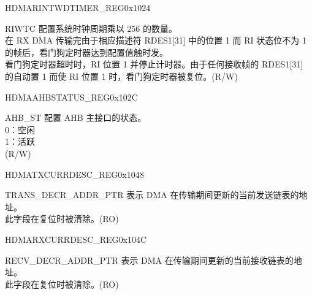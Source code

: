 \begin{register}{H}{DMARINTWDTIMER\_REG}{0x1024}\label{regdesc:DMARINTWDTIMERREG}
%
%
\regnewline%
\begin{regdesc}\begin{reglist}
\item [RIWTC] 配置系统时钟周期乘以 256 的数量。\\
在 RX DMA 传输完由于相应描述符 RDES1[31] 中的位置 1 而 RI 状态位不为 1 的帧后，看门狗定时器达到配置值触时发。\\
看门狗定时器超时时，RI 位置 1 并停止计时器。由于任何接收帧的 RDES1[31] 的自动置 1 而使 RI 位置 1 时，看门狗定时器被复位。(R/W)
\end{reglist}\end{regdesc}
\end{register}

\begin{register}{H}{DMAAHBSTATUS\_REG}{0x102C}\label{regdesc:DMAHBSTATUSREG}
%
%
\regnewline%
\begin{regdesc}\begin{reglist}
\item [AHB\_ST] 配置 AHB 主接口的状态。\\
0：空闲\\
1：活跃\\(R/W)
\end{reglist}\end{regdesc}
\end{register}

\begin{register}{H}{DMATXCURRDESC\_REG}{0x1048}\label{regdesc:DMATXCURRDESCREG}
%
\regnewline%
\begin{regdesc}\begin{reglist}
\item [TRANS\_DECR\_ADDR\_PTR] 表示 DMA 在传输期间更新的当前发送链表的地址。\\
此字段在复位时被清除。(RO)
\end{reglist}\end{regdesc}
\end{register}

\begin{register}{H}{DMARXCURRDESC\_REG}{0x104C}\label{regdesc:DMARXCURRDESCREG}
%
\regnewline%
\begin{regdesc}\begin{reglist}
\item [RECV\_DECR\_ADDR\_PTR] 表示 DMA 在传输期间更新的当前接收链表的地址。\\
此字段在复位时被清除。(RO)
\end{reglist}\end{regdesc}
\end{register}

